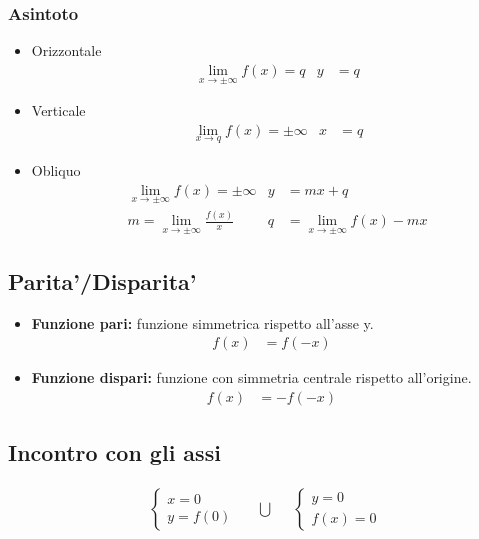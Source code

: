 \documentclass[a4paper]{article}
\begin{document}
		\subsubsection{Asintoto}
		\begin{itemize}
			\item Orizzontale\\
			\begin{align*}
				&\lim\limits_{x \to \pm \infty}{f(x)} = q	&	y&=q
			\end{align*}
			
			\item Verticale\\
			\begin{align*}
				&\lim\limits_{x \to q}{f(x)} = \pm \infty	&	x&=q
			\end{align*}
			\item Obliquo\\
			\begin{align*}
			&\lim\limits_{x \to \pm \infty}{f(x)} = \pm \infty	&	y&=mx+q\\
			&m=\lim\limits_{x \to \pm \infty}{\frac{f(x)}{x}}   &	q&=\lim\limits_{x \to \pm \infty}{f(x)-mx}
			\end{align*}
						
		\end{itemize}
		
		\subsection{Parita'/Disparita'}
		\begin{itemize}
			\item \textbf{Funzione pari:} funzione simmetrica rispetto all'asse y.
			\begin{align*}
				f(x) &= f(-x)
			\end{align*}
			\item \textbf{Funzione dispari:} funzione con simmetria centrale rispetto all'origine.
			\begin{align*}
				f(x) &= -f(-x)
			\end{align*}
		\end{itemize}
		
		\subsection{Incontro con gli assi}
		\begin{align*}
			&\begin{cases}
			x = 0\\
			y = f(0)
			\end{cases}	&	&\bigcup &	&\begin{cases}
			y = 0\\
			f(x) = 0
			\end{cases}
		\end{align*}
		
\end{document}
